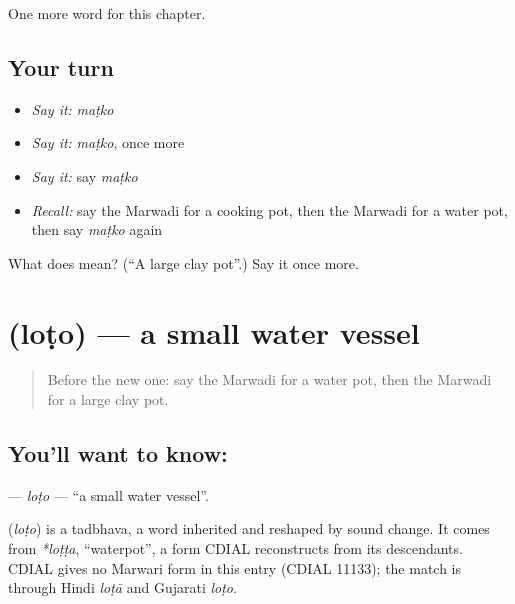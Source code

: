 \begin{grammarlens}[title={What you've built}]
One more word for this chapter.
\end{grammarlens}

\subsection*{Your turn}
\begin{itemize}
\raggedright
  \item \emph{Say it:} \emph{maṭko}
  \item \emph{Say it:} \emph{maṭko}, once more
  \item \emph{Say it:} say \emph{maṭko}
  \item \emph{Recall:} say the Marwadi for a cooking pot, then the Marwadi for a water pot, then say \emph{maṭko} again
\end{itemize}

\begin{tcolorbox}[breakable,colback=teal!4,colframe=teal!35!black,title={Before you move on}]
What does  mean? (\textquotedblleft{}A large clay pot\textquotedblright{}.) Say it once more.
\end{tcolorbox}
\section[\texorpdfstring{\mw{लोटो} (loṭo)}{लोटो (loṭo)}]{ (loṭo) — a small water vessel}

\label{lesson:MW-C119-loto}



\begin{quote}
Before the new one: say the Marwadi for a water pot, then the Marwadi for a large clay pot.
\end{quote}

\subsection*{You'll want to know: }
\textbf{} — \emph{loṭo} — \textquotedblleft{}a small water vessel\textquotedblright{}.

\begin{cousinweb}
\textbf{} (\emph{loṭo}) is a tadbhava, a word inherited and reshaped by sound change. It comes from \emph{*loṭṭa}, \textquotedblleft{}waterpot\textquotedblright{}, a form CDIAL reconstructs from its descendants. CDIAL gives no Marwari form in this entry (CDIAL 11133); the match is through Hindi \emph{loṭā} and Gujarati \emph{loṭo}.
\end{cousinweb}

